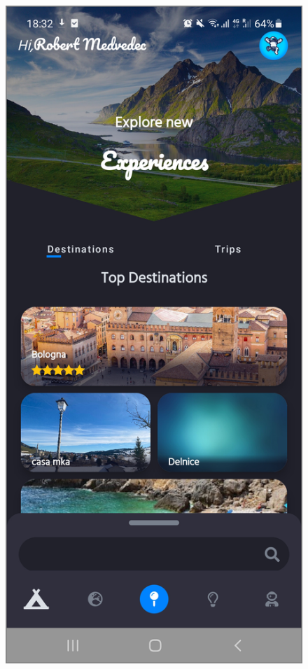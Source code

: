 \begin{figure}[!htb]
\centering
\begin{minipage}{.45\textwidth}
\centering
\includegraphics[width=.95\textwidth]{../Images/UI/DestinationsMain.jpg}

\end{minipage}
\end{figure}
